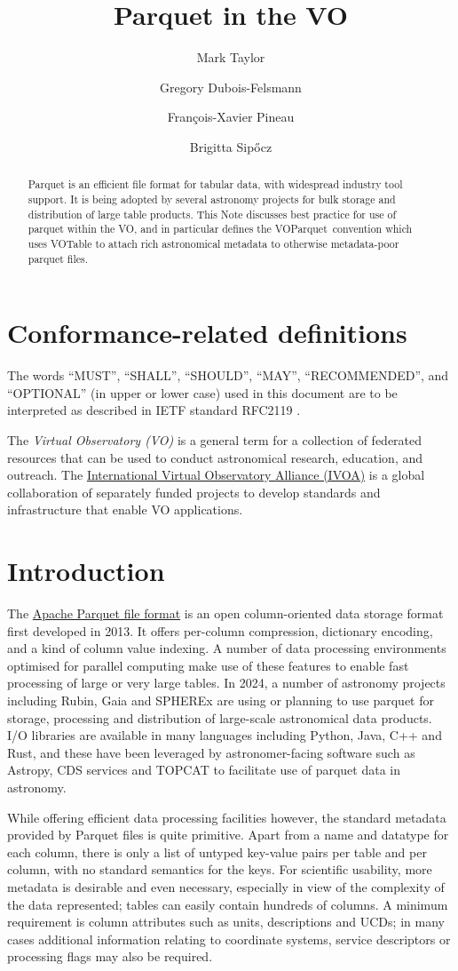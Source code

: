 \documentclass[11pt,a4paper]{ivoa}
\title{Parquet in the VO}
\author[https://wiki.ivoa.net/twiki/bin/view/IVOA/MarkTaylor]
       {Mark Taylor}
\author[https://wiki.ivoa.net/twiki/bin/view/IVOA/GregoryDuboisFelsmann]
       {Gregory Dubois-Felsmann}
\author[https://wiki.ivoa.net/twiki/bin/view/IVOA/FrancoisXavierPineau]
       {Fran\c{c}ois-Xavier Pineau}
\author{Brigitta Sip\H{o}cz}
\newcommand{\voparquet}{VOParquet}
\begin{document}
\begin{abstract}
Parquet is an efficient file format for tabular data,
with widespread industry tool support.
It is being adopted by several astronomy projects for bulk storage and
distribution of large table products.
This Note discusses best practice for use of parquet within the VO,
and in particular defines the \voparquet\ convention
which uses VOTable to attach rich astronomical metadata
to otherwise metadata-poor parquet files.
\end{abstract}

\section*{Conformance-related definitions}

The words ``MUST'', ``SHALL'', ``SHOULD'', ``MAY'', ``RECOMMENDED'', and
``OPTIONAL'' (in upper or lower case) used in this document are to be
interpreted as described in IETF standard RFC2119 \citep{std:RFC2119}.

The \emph{Virtual Observatory (VO)} is a
general term for a collection of federated resources that can be used
to conduct astronomical research, education, and outreach.
The \href{https://www.ivoa.net}{International
Virtual Observatory Alliance (IVOA)} is a global
collaboration of separately funded projects to develop standards and
infrastructure that enable VO applications.


\section{Introduction}
\label{sec:intro}

The \href{https://parquet.apache.org/docs/}{Apache Parquet file format}
is an open column-oriented data storage
format first developed in 2013.
It offers per-column compression, dictionary encoding, and
a kind of column value indexing.
A number of data processing environments optimised for parallel
computing make use of these features to enable fast processing
of large or very large tables.
In 2024, a number of astronomy projects including Rubin, Gaia and SPHEREx
are using or planning to use parquet for storage, processing
and distribution of large-scale astronomical data products.
I/O libraries are available in many languages including Python,
Java, C++ and Rust, and these have been leveraged by astronomer-facing
software such as Astropy, CDS services and TOPCAT to facilitate
use of parquet data in astronomy.

While offering efficient data processing facilities however,
the standard metadata provided by Parquet files is quite primitive.
Apart from a name and datatype for each column,
there is only a list of untyped key-value pairs per table
and per column, with no standard semantics for the keys.
For scientific usability, more metadata is desirable and even necessary,
especially in view of the complexity of the data represented;
tables can easily contain hundreds of columns.
A minimum requirement is column attributes such as units, descriptions
and UCDs; in many cases additional information relating to
coordinate systems, service descriptors or processing flags
may also be required.
\end{document}
